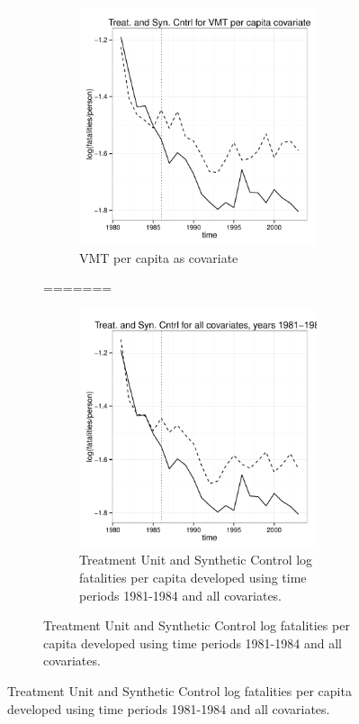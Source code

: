 \documentclass[letterpaper, 12pt]{article}
\begin{document}
\begin{figure}
\begin{centering}
\begin{figure}
\begin{centering}
    \begin{subfigure}[b]{\textwidth}
      \includegraphics{img-split-vmt.pdf}
      \caption{VMT per capita as covariate}
      \label{fig:c12c}
    \end{subfigure}
    \caption{Plots of log(fatalities per capita) in synthetic control unit and treatment unit}\label{fig:c12}
    \endgroup
=======
\begin{figure}[htbp]
\begin{center}
\includegraphics{img-split-full1984.pdf}
\caption{Treatment Unit and Synthetic Control log fatalities per capita developed using time periods 1981-1984 and all covariates.}
\label{fig:c15}
\end{center}
\end{figure}


\end{centering}
\end{figure}
\end{centering}
\end{figure}
\end{document}
